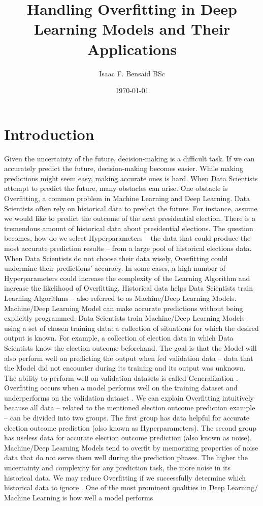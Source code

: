 \documentclass[oneside,12pt,article]{article}
\title{Handling Overfitting in Deep Learning Models and Their Applications}
\date{\today}
\author{Isaac F. Bensaid BSc }
\begin{document}
 \maketitle
 \newpage
 \tableofcontents
 \newpage
 \section{Introduction}


Given the uncertainty of the future, decision-making is a difficult task. If we can accurately predict the future, decision-making becomes easier. While making predictions might seem easy, making accurate ones is hard. When Data Scientists attempt to predict the future, many obstacles can arise. One obstacle is Overfitting, a common problem in Machine Learning and Deep Learning. Data Scientists often rely on historical data to predict the future. For instance, assume we would like to predict the outcome of the next presidential election. There is a tremendous amount of historical data about presidential elections. The question becomes, how do we select Hyperparameters – the data that could produce the most accurate prediction results – from a large pool of historical elections data. When Data Scientists do not choose their data wisely, Overfitting could undermine their predictions' accuracy. In some cases, a high number of Hyperparameters could increase the complexity of the Learning Algorithm and increase the likelihood of Overfitting\cite{ying2019overview}. Historical data helps Data Scientists train Learning Algorithms – also referred to as Machine/Deep Learning Models. Machine/Deep Learning Model can make accurate predictions without being explicitly programmed. Data Scientists train Machine/Deep Learning Models using a set of chosen training data: a collection of situations for which the desired output is known. For example, a collection of election data in which Data Scientists know the election outcome beforehand. The goal is that the Model will also perform well on predicting the output when fed validation data – data that the Model did not encounter during its training and its output was unknown. The ability to perform well on validation datasets is called Generalization \cite{bengio2017deep}. Overfitting occurs when a model performs well on the training dataset and underperforms on the validation dataset \cite{ying2019overview}. We can explain Overfitting intuitively because all data – related to the mentioned election outcome prediction example – can be divided into two groups. The first group has data helpful for accurate election outcome prediction (also known as Hyperparameters). The second group has useless data for accurate election outcome prediction (also known as noise\cite{ying2019overview}). Machine/Deep Learning Models tend to overfit by memorizing properties of noise data that do not serve them well during the prediction phases. The higher the uncertainty and complexity for any prediction task, the more noise in its historical data. We may reduce Overfitting if we successfully determine which historical data to ignore \cite{bengio2017deep}. One of the most prominent qualities in Deep Learning/ Machine Learning is how well a model performs 
\end{document}
